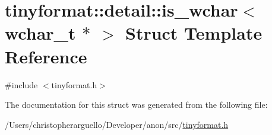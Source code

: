 \hypertarget{structtinyformat_1_1detail_1_1is__wchar_3_01wchar__t_01_5_01_4}{}\section{tinyformat\+:\+:detail\+:\+:is\+\_\+wchar$<$ wchar\+\_\+t $\ast$ $>$ Struct Template Reference}
\label{structtinyformat_1_1detail_1_1is__wchar_3_01wchar__t_01_5_01_4}


{\ttfamily \#include $<$tinyformat.\+h$>$}



The documentation for this struct was generated from the following file\+:\begin{DoxyCompactItemize}
\item 
/\+Users/christopherarguello/\+Developer/anon/src/\mbox{\hyperlink{tinyformat_8h}{tinyformat.\+h}}\end{DoxyCompactItemize}
